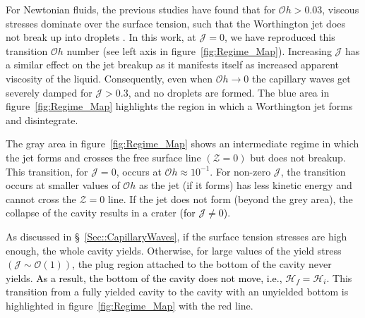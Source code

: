 \documentclass[final]{jfm}
\newcommand*\red{\textcolor{black}}
\begin{document}
For Newtonian fluids, the previous studies have found that for $\mathcal{O}h > 0.03$, viscous stresses dominate over the surface tension, such that the Worthington jet does not break up into droplets \citep{san2011size, ghabache2014physics, walls2015jet}. In this work, at $\mathcal{J} = 0$, we have reproduced this transition $\mathcal{O}h$ number (see left axis in figure~\ref{fig:Regime_Map}). Increasing $\mathcal{J}$ has a similar effect on the jet breakup as it manifests itself as increased apparent viscosity of the liquid. Consequently, even when $\mathcal{O}h \to 0$ the capillary waves get severely damped for $\mathcal{J} > 0.3$, and no droplets are formed. The blue area in figure~\ref{fig:Regime_Map} highlights the region in which a Worthington jet forms and disintegrate. 

The gray area in figure~\ref{fig:Regime_Map} shows an intermediate regime in which the jet forms  and crosses the free surface line $\left(\mathcal{Z} = 0\right)$ but does not breakup. This transition, for $\mathcal{J} = 0$, occurs at $\mathcal{O}h \approx 10^{-1}$. For non-zero $\mathcal{J}$, the transition {\color{red}occurs at smaller values} of $\mathcal{O}h$  as the jet (if it forms) has less kinetic energy and cannot cross the $\mathcal{Z} = 0$ line. If the jet does not form (beyond the grey area), the collapse of the cavity results in a crater \red{(for $\mathcal{J} \ne 0$)}. 

As discussed in \S~\ref{Sec::CapillaryWaves}, if the surface tension stresses are high enough, the whole cavity yields. Otherwise, for large values of the yield stress $\left(\mathcal{J} \sim \mathcal{O}\left(1\right)\right)$, the plug region attached to the bottom of the cavity never yields. \red{As a result, the bottom of the cavity does not move, i.e., $\mathcal{H}_f = \mathcal{H}_i$.} This transition from a fully yielded cavity to the cavity with an unyielded bottom is highlighted in figure~\ref{fig:Regime_Map} with the red line.
\end{document}
